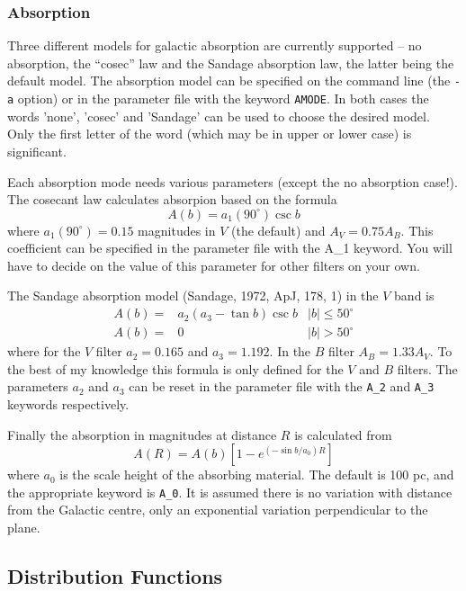\documentclass[11pt,twoside]{article}
\begin{document}
\subsubsection*{Absorption}

Three different models for galactic absorption are currently supported -- no
absorption, the ``cosec'' law and the Sandage absorption law, the latter being
the default model. The absorption model can be specified on the command line
(the {\tt -a} option) or in the parameter file with the keyword {\tt AMODE}. 
In both cases the words 'none', 'cosec' and 'Sandage' can be used to choose the
desired model. Only the first letter of the word (which may be in upper or
lower case) is significant.

Each absorption mode needs various parameters (except the no absorption
case!). The cosecant law calculates absorpion based on the formula
\[
A(b) = a_1(90^\circ) \csc b
\]
where $a_1(90^\circ) = 0.15$ magnitudes in $V$ (the default) and 
$A_V = 0.75 A_B$. This coefficient can be specified in the parameter file
with the A\_1 keyword. You will have to decide on the value of this parameter
for other filters on your own.

The Sandage absorption model (Sandage, 1972, ApJ, 178, 1) in the $V$ band is
\[
\begin{array}{lll}
A(b) = & a_2 ( a_3 - \tan b) \csc b & |b| \leq 50^\circ \\
A(b) = & 0 & |b| > 50^\circ
\end{array}
\]
where for the $V$ filter $a_2 = 0.165$ and $a_3 = 1.192$. In the $B$ filter
$A_B = 1.33 A_V$. To the best of my knowledge this formula is only defined
for the $V$ and $B$ filters. The parameters $a_2$ and $a_3$ can be 
reset in the parameter file with the {\tt A\_2} and {\tt A\_3} keywords 
respectively.

Finally the absorption in magnitudes at distance $R$ is calculated from
\[
A(R) = A(b) \left[ 1 - e^{(- \sin b / a_0) R} \right]
\]
where $a_0$ is the scale height of the absorbing material. The default is
100 pc, and the appropriate keyword is {\tt A\_0}. It is assumed there is no
variation with distance from the Galactic centre, only an exponential
variation perpendicular to the plane.

\subsection{Distribution Functions}
\end{document}
